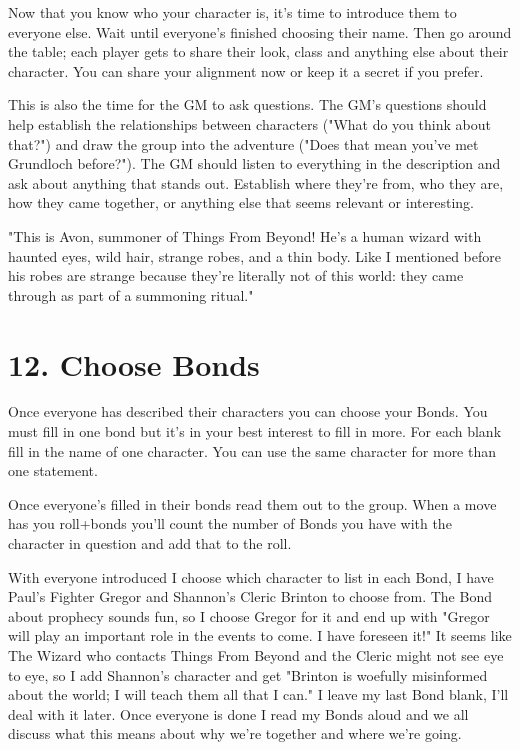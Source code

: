 Now that you know who your character is, it's time to introduce them to everyone else. Wait until everyone's finished choosing their name. Then go around the table; each player gets to share their look, class and anything else about their character. You can share your alignment now or keep it a secret if you prefer.

       

This is also the time for the GM to ask questions. The GM's questions should help establish the relationships between characters ("What do you think about that?") and draw the group into the adventure ("Does that mean you've met Grundloch before?"). The GM should listen to everything in the description and ask about anything that stands out. Establish where they're from, who they are, how they came together, or anything else that seems relevant or interesting.

       
\startExample
"This is Avon, summoner of Things From Beyond! He's a human wizard with haunted eyes, wild hair, strange robes, and a thin body. Like I mentioned before his robes are strange because they're literally not of this world: they came through as part of a summoning ritual."
\stopExample
       
\section{12. Choose Bonds}     
       

Once everyone has described their characters you can choose your Bonds. You must fill in one bond but it's in your best interest to fill in more. For each blank fill in the name of one character. You can use the same character for more than one statement.

       

Once everyone’s filled in their bonds read them out to the group. When a move has you roll+bonds you'll count the number of Bonds you have with the character in question and add that to the roll.

       
\startExample
With everyone introduced I choose which character to list in each Bond, I have Paul's Fighter Gregor and Shannon's Cleric Brinton to choose from. The Bond about prophecy sounds fun, so I choose Gregor for it and end up with "Gregor will play an important role in the events to come. I have foreseen it!" It seems like The Wizard who contacts Things From Beyond and the Cleric might not see eye to eye, so I add Shannon's character and get "Brinton is woefully misinformed about the world; I will teach them all that I can." I leave my last Bond blank, I'll deal with it later. Once everyone is done I read my Bonds aloud and we all discuss what this means about why we're together and where we're going.
\stopExample
                
